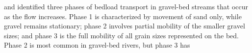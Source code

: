 \citet{Ashworth1989} and \citet{Warburton1992} identified three phases of bedload transport in gravel-bed streams that occur as the flow increases. Phase 1 is characterized by movement of sand only, while gravel remains stationary; phase 2 involves partial mobility of the smaller gravel sizes; and phase 3 is the full mobility of all grain sizes represented on the bed.
Phase 2 is most common in gravel-bed rivers, but phase 3 has 

